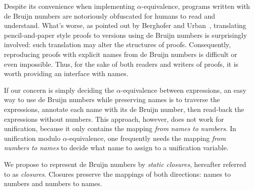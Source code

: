 \documentclass[a4paper,UKenglish]{lipics-v2016}
\begin{document}
Despite its convenience when implementing $\alpha$-equivalence,
programs written with de Bruijn numbers are notoriously obfuscated for
humans to read and understand.  What's worse, as pointed out by
Berghofer and Urban~\citep{berghofer_head--head_2007}, translating
pencil-and-paper style proofs to versions using de Bruijn numbers is
surprisingly involved: such translation may alter the structures of
proofs.  Consequently, reproducing proofs with explicit names from de
Bruijn numbers is difficult or even impossible.  Thus, for the sake of
both readers and writers of proofs, it is worth providing an interface
with names.

If our concern is simply deciding the $\alpha$-equivalence between
expressions, an easy way to use de Bruijn numbers while preserving
names is to traverse the expressions, annotate each name with its de
Bruijn number, then read-back the expressions without numbers.  This
approach, however, does not work for unification, because it only
contains the mapping \emph{from names to numbers}.  In unification
modulo $\alpha$-equivalence, one frequently needs the mapping
\emph{from numbers to names} to decide what name to assign to a
unification variable.

We propose to represent de Bruijn numbers by \emph{static closures},
hereafter referred to as \emph{closures}.  Closures preserve the
mappings of both directions: names to numbers and numbers to names.
\end{document}
